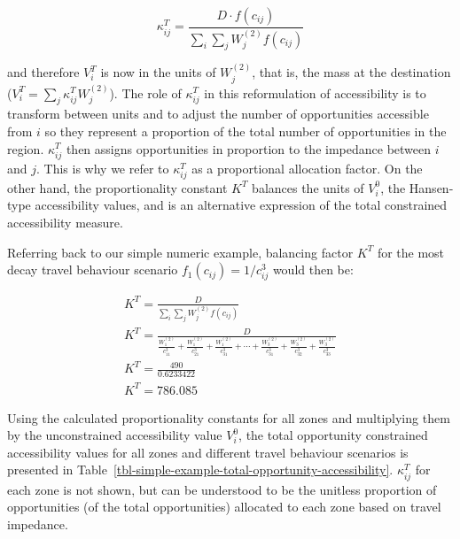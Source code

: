 \documentclass[
]{article}
\begin{document}
\[
\kappa_{ij}^T = \frac{D\cdot f(c_{ij})}{\sum_i\sum_j W^{(2)}_jf(c_{ij})}
\]

\noindent and therefore \(V^T_i\) is now in the units of \(W^{(2)}_j\),
that is, the mass at the destination
(\(V^T_i = \sum_j \kappa_{ij}^T W^{(2)}_j\)). The role of
\(\kappa_{ij}^T\) in this reformulation of accessibility is to transform
between units and to adjust the number of opportunities accessible from
\(i\) so they represent a proportion of the total number of
opportunities in the region. \(\kappa_{ij}^T\) then assigns
opportunities in proportion to the impedance between \(i\) and \(j\).
This is why we refer to \(\kappa_{ij}^T\) as a proportional allocation
factor. On the other hand, the proportionality constant \(K^T\) balances
the units of \(V^0_i\), the Hansen-type accessibility values, and is an
alternative expression of the total constrained accessibility measure.

Referring back to our simple numeric example, balancing factor \(K^T\)
for the most decay travel behaviour scenario
\(f_1(c_{ij}) = 1/c_{ij}^3\) would then be:

\[
\begin{array}{l}
K^T = \frac{D}{\sum_{i}\sum_{j} W_j^{(2)} f(c_{ij})}\\
K^T = \frac{D}{\frac{W_1^{(2)}}{c_{11}^3}+\frac{W_1^{(2)}}{c_{21}^3} + \frac{W_1^{(2)}}{c_{31}^3} + \cdots + \frac{W_3^{(2)}}{c_{31}^3} + \frac{W_3^{(2)}}{c_{32}^3} + \frac{W_3^{(2)}}{c_{33}^3}
}\\
K^T = \frac{490}{0.6233422} \\
K^T = 786.085
\end{array}
\]

Using the calculated proportionality constants for all zones and
multiplying them by the unconstrained accessibility value \(V^0_i\), the
total opportunity constrained accessibility values for all zones and
different travel behaviour scenarios is presented in
Table~\ref{tbl-simple-example-total-opportunity-accessibility}.
\(\kappa_{ij}^T\) for each zone is not shown, but can be understood to
be the unitless proportion of opportunities (of the total opportunities)
allocated to each zone based on travel impedance.
\end{document}
